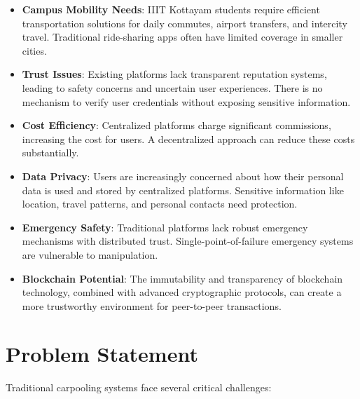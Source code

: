 \documentclass[12pt]{report}
\theoremstyle{plain}
\theoremstyle{definition}
\theoremstyle{remark}
\begin{document}
\begin{itemize}
    \item \textbf{Campus Mobility Needs}: IIIT Kottayam students require efficient transportation solutions for daily commutes, airport transfers, and intercity travel. Traditional ride-sharing apps often have limited coverage in smaller cities.
    
    \item \textbf{Trust Issues}: Existing platforms lack transparent reputation systems, leading to safety concerns and uncertain user experiences. There is no mechanism to verify user credentials without exposing sensitive information.
    
    \item \textbf{Cost Efficiency}: Centralized platforms charge significant commissions, increasing the cost for users. A decentralized approach can reduce these costs substantially.
    
    \item \textbf{Data Privacy}: Users are increasingly concerned about how their personal data is used and stored by centralized platforms. Sensitive information like location, travel patterns, and personal contacts need protection.
    
    \item \textbf{Emergency Safety}: Traditional platforms lack robust emergency mechanisms with distributed trust. Single-point-of-failure emergency systems are vulnerable to manipulation.
    
    \item \textbf{Blockchain Potential}: The immutability and transparency of blockchain technology, combined with advanced cryptographic protocols, can create a more trustworthy environment for peer-to-peer transactions.
\end{itemize}

\section{Problem Statement}

Traditional carpooling systems face several critical challenges:
\end{document}
